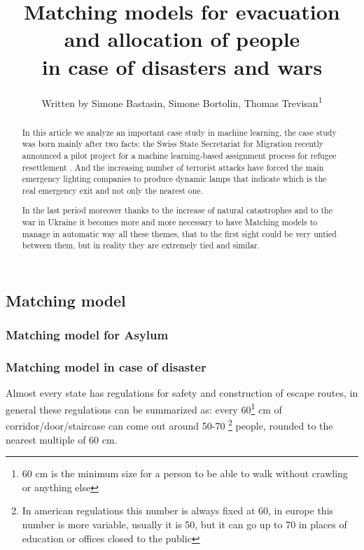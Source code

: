 \documentclass[letterpaper]{article} %
\title{Matching models for evacuation and allocation of people\\in case of disasters and wars}
\author{
    Written by Simone Bastasin, Simone Bortolin, Thomas Trevisan\textsuperscript{\rm 1}
    \\
}
\begin{document}
\maketitle

\begin{abstract}
    In this article we analyze an important case study in machine learning, the case study was born mainly after two facts:
    the Swiss State Secretariat for Migration recently announced a pilot project for a machine
    learning-based assignment process for refugee resettlement \cite{olbergml}. 
    And the increasing number of terrorist attacks have forced the main emergency lighting companies to produce dynamic lamps 
    that indicate which is the real emergency exit and not only the nearest one.

    In the last period moreover thanks to the increase of natural catastrophes and to the war in Ukraine it becomes more and more 
    necessary to have Matching models to manage in automatic way all these themes, that to the first sight could be very untied 
    between them, but in reality they are extremely tied and similar.
\end{abstract}

\noindent \cite{olbergml} \cite{basshuysen} \cite{delacretaz} \cite{andersson} 

\subsection{Matching model}

\cite{olbergml} \cite{basshuysen} \cite{delacretaz} 

\subsubsection{Matching model for Asylum}

\cite{olbergml} \cite{basshuysen} \cite{delacretaz} 

\subsubsection{Matching model in case of disaster}

Almost every state has regulations for safety and construction of escape routes, in general these 
regulations can be summarized as: every 60\footnote{60 cm is the minimum size for a person to be 
able to walk without crawling or anything else} cm of corridor/door/staircase can come out around 50-70
\footnote{In american regulations this number is always fixed at 60, in europe this number is more 
variable, usually it is 50, but it can go up to 70 in places of education or offices closed to the public} 
people, rounded to the nearest multiple of 60 cm.
\end{document}
